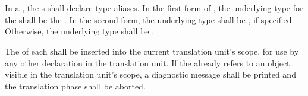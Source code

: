 \begin{grammar}
 \\
	  \\

 \\
	 \optional{\terminal{,}} \\
	 \terminal{,}  \\

 \\
	 \terminal{=}  \\
	 \terminal{=}  \\

 \\
	  \terminal{\{}  \terminal{\}} \\

 \\
	 \optional{\terminal{,}} \\
	 \terminal{,}  \\

 \\
	 \\
	 \terminal{=}  \\

 \\
	 \\
	 \\

\end{grammar}

\specsubsubitem
In a , the s shall
declare type aliases. In the first form of , the
underlying type for the  shall be the
. In the second form, the underlying type shall be
, if specified. Otherwise, the underlying type shall
be .

\specsubsubitem
The  of each  shall be
inserted into the current translation unit's scope, for use by any other
declaration in the translation unit. If the  already
refers to an object visible in the translation unit's scope, a diagnostic
message shall be printed and the translation phase shall be aborted.


